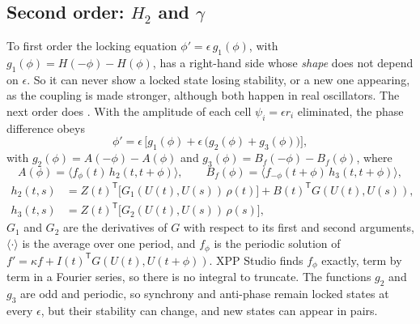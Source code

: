 \documentclass[11pt,a4paper]{article}
\newcommand{\XS}{\textsf{XPP Studio}}
\begin{document}
\subsection*{Second order: $H_2$ and $\gamma$}\label{sec:hsecond}

To first order the locking equation $\phi'=\epsilon\,g_1(\phi)$, with $g_1(\phi)=H(-\phi)-H(\phi)$, has a right-hand side whose \emph{shape} does not depend on $\epsilon$. So it can never show a locked state losing stability, or a new one appearing, as the coupling is made stronger, although both happen in real oscillators. The next order does \cite{wilson2019}. With the amplitude of each cell $\psi_i=\epsilon r_i$ eliminated, the phase difference obeys
\begin{equation}
  \phi'=\epsilon\,\bigl[g_1(\phi)+\epsilon\,\bigl(g_2(\phi)+g_3(\phi)\bigr)\bigr],
\end{equation}
with $g_2(\phi)=A(-\phi)-A(\phi)$ and $g_3(\phi)=B_f(-\phi)-B_f(\phi)$, where
\begin{equation}
  A(\phi)=\bigl\langle f_\phi(t)\,h_2(t,t+\phi)\bigr\rangle,\qquad
  B_f(\phi)=\bigl\langle f_{-\phi}(t+\phi)\,h_3(t,t+\phi)\bigr\rangle,
\end{equation}
\begin{align}
  h_2(t,s)&=Z(t)^{\mathsf T}\bigl[G_1(U(t),U(s))\,\rho(t)\bigr]+B(t)^{\mathsf T}G(U(t),U(s)),\\
  h_3(t,s)&=Z(t)^{\mathsf T}\bigl[G_2(U(t),U(s))\,\rho(s)\bigr],
\end{align}
$G_1$ and $G_2$ are the derivatives of $G$ with respect to its first and second arguments, $\langle\cdot\rangle$ is the average over one period, and $f_\phi$ is the periodic solution of $f'=\kappa f+I(t)^{\mathsf T}G(U(t),U(t+\phi))$. \XS{} finds $f_\phi$ exactly, term by term in a Fourier series, so there is no integral to truncate. The functions $g_2$ and $g_3$ are odd and periodic, so synchrony and anti-phase remain locked states at every $\epsilon$, but their stability can change, and new states can appear in pairs.
\end{document}
